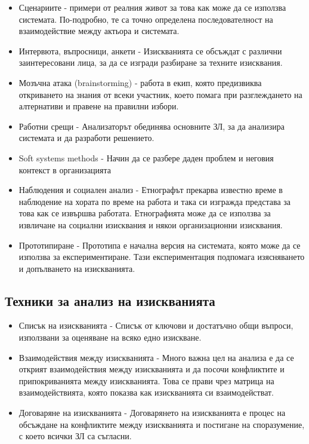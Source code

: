 \documentclass[fleqn,12pt]{article}
\begin{document}
\begin{itemize}
	\item Сценариите - примери от реалния живот за това как може да се използва системата. По-подробно, те са точно определена последователност на взаимодействие между актьора и системата.
	\item Интервюта, въпросници, анкети - Изискванията се обсъждат с различни заинтересовани лица, за да се изгради разбиране за техните изисквания.
	\item Мозъчна атака (brainstorming) - работа в екип, която предизвиква откриването на знания от всеки участник, което помага при разглеждането на алтернативи и правене на правилни избори.
	\item Работни срещи - Анализаторът обединява основните ЗЛ, за да анализира системата и да разработи решението.
	\item Soft systems methods - Начин да се разбере даден проблем и неговия контекст в организацията
	\item Наблюдения и социален анализ - Етнографът прекарва известно време в наблюдение на хората по време на работа и така си изгражда представа за това как се извършва работата. Етнографията може да се използва за извличане на социални изисквания и някои организационни изисквания.
	\item Прототипиране - Прототипа е начална версия на системата, която може да се използва за експериментиране. Тази експериментация подпомага изясняването и допълването на изискванията.
\end{itemize}

\subsection{Техники за анализ на изискванията}

\begin{itemize}
	\item Списък на изискванията - Списък от ключови и достатъчно общи въпроси, използвани за оценяване на всяко едно изискване.
	\item Взаимодействия между изискванията - Много важна цел на анализа е да се открият взаимодействия между изискванията и да посочи конфликтите и припокриванията между изискванията. Това се прави чрез матрица на взаимодействията, която показва как изискванията си взаимодействат.
	\item Договаряне на изискванията - Договарянето на изискванията е процес на обсъждане на конфликтите между изискванията и постигане на споразумение, с което всички ЗЛ са съгласни.
\end{itemize}
\end{document}
